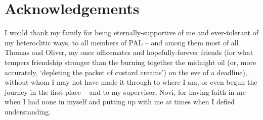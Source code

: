 
\begingroup
\let\clearpage\relax
\let\cleardoublepage\relax
\let\cleardoublepage\relax
%
\chapter*{Acknowledgements}
%
I would thank my family for being eternally-supportive of me and ever-tolerant of my heteroclitic
ways, to all members of PAL -- and among them most of all Thomas and Oliver, my once officemates
and hopefully-forever friends (for what tempers friendship stronger than the burning together the
midnight oil (or, more accurately, `depleting the packet of custard creams') on the eve of a
deadline), without whom I may not have made it through to where I am, or even begun the journey in
the first place -- and to my supervisor, Novi, for having faith in me when I had none in myself and
putting up with me at times when I defied understanding.
%
\endgroup
